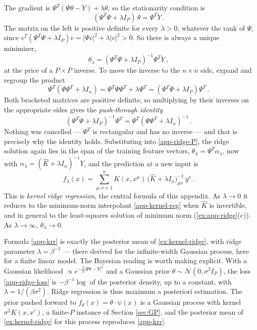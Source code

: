 \documentclass[11pt]{article}
\newcommand{\CN}{{\mathcal N}}
\begin{document}
The gradient is $\Psi^T(\Psi\theta - Y) + \lambda\theta$, so the stationarity condition is
%
\begin{equation}
    (\Psi^T\Psi + \lambda I_P)\,\theta = \Psi^TY\,. \label{app-ridge-normal}
\end{equation}
%
The matrix on the left is positive definite for every $\lambda>0$, whatever the rank of $\Psi$, since $v^T(\Psi^T\Psi+\lambda I_P)v = |\Psi v|^2+\lambda|v|^2>0$. So there is always a unique minimizer,
%
\begin{equation}
    \theta_\lambda = (\Psi^T\Psi + \lambda I_P)^{-1}\Psi^TY\,, \label{app-ridge-P}
\end{equation}
%
at the price of a $P\times P$ inverse. To move the inverse to the $n\times n$ side, expand and regroup the product
%
\begin{equation}
    \Psi^T(\Psi\Psi^T + \lambda I_n) = \Psi^T\Psi\Psi^T + \lambda\Psi^T = (\Psi^T\Psi + \lambda I_P)\Psi^T\,.
\end{equation}
%
Both bracketed matrices are positive definite, so multiplying by their inverses on the appropriate sides gives the \emph{push-through identity}
%
\begin{equation}
    (\Psi^T\Psi + \lambda I_P)^{-1}\Psi^T = \Psi^T(\Psi\Psi^T + \lambda I_n)^{-1}\,. \label{app-pushthrough}
\end{equation}
%
Nothing was cancelled --- $\Psi^T$ is rectangular and has no inverse --- and that is precisely why the identity holds. Substituting into \eqref{app-ridge-P}, the ridge solution again lies in the span of the training feature vectors, $\theta_\lambda = \Psi^T\alpha_\lambda$, now with $\alpha_\lambda = (\hat K+\lambda I_n)^{-1}Y$, and the prediction at a new input is
%
\begin{equation}
    f_\lambda(x) = \sum_{\mu,\nu=1}^n K(x,x^\mu)\,\big(\hat K + \lambda I_n\big)^{-1}_{\mu\nu}\,y^\nu\,. \label{app-krr}
\end{equation}
%
This is \emph{kernel ridge regression}, the central formula of this appendix. As $\lambda\to 0$ it reduces to the minimum-norm interpolant \eqref{app-kernel-reg} when $\hat K$ is invertible, and in general to the least-squares solution of minimum norm (\cref{ex:app-ridge}(c)). As $\lambda\to\infty$, $\theta_\lambda\to 0$.

Formula \eqref{app-krr} is exactly the posterior mean of \cref{ex:kernel-ridge}, with ridge parameter $\lambda = \beta^{-1}$ --- there derived for the infinite-width Gaussian process, here for a finite linear model. The Bayesian reading is worth making explicit. With a Gaussian likelihood $\propto e^{-\frac{\beta}{2}|\Psi\theta-Y|^2}$ and a Gaussian prior $\theta\sim\CN(0,\sigma^2 I_P)$, the loss \eqref{app-ridge-loss} is $-\beta^{-1}\log$ of the posterior density, up to a constant, with $\lambda = 1/(\beta\sigma^2)$. Ridge regression is thus maximum a posteriori estimation. The prior pushed forward to $f_\theta(x) = \theta\cdot\psi(x)$ is a Gaussian process with kernel $\sigma^2K(x,x')$, a finite-$P$ instance of Section \ref{sec:GP}, and the posterior mean of \cref{ex:kernel-ridge} for this process reproduces \eqref{app-krr}.
\end{document}
